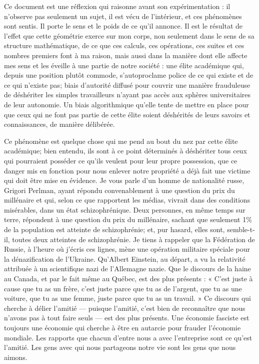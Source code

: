 \documentclass[11pt,a4paper]{article}
\begin{document}
Ce document est une réflexion qui raisonne avant son expérimentation : il n'observe pas seulement un sujet, il est vécu de l'intérieur, et ces phénomènes sont sentis. Il porte le sens et le poids de ce qu'il annonce. Il est le résultat de l'effet que cette géométrie exerce sur mon corps, non seulement dans le sens de sa structure mathématique, de ce que ces calculs, ces opérations, ces suites et ces nombres premiers font à ma raison, mais aussi dans la manière dont elle affecte mes sens et les éveille à une partie de notre société : une élite académique qui, depuis une position plutôt commode, s'autoproclame police de ce qui existe et de ce qui n'existe pas; biais d'autorité diffusé pour couvrir une manière frauduleuse de déshériter les simples travailleurs n'ayant pas accès aux sphères universitaires de leur autonomie. Un biais algorithmique qu'elle tente de mettre en place pour que ceux qui ne font pas partie de cette élite soient déshérités de leurs savoirs et connaissances, de manière délibérée.

Ce phénomène est quelque chose qui me pend au bout du nez par cette élite académique; bien entendu, ils sont à ce point déterminés à déshériter tous ceux qui pourraient posséder ce qu'ils veulent pour leur propre possession, que ce danger mis en fonction pour nous enlever notre propriété a déjà fait une victime qui doit être mise en évidence. Je vous parle d'un homme de nationalité russe, Grigori Perlman, ayant répondu convenablement à une question du prix du millénaire et qui, selon ce que rapportent les médias, vivrait dans des conditions misérables, dans un état schizophrénique. Deux personnes, en même temps sur terre, répondent à une question du prix du millénaire, sachant que seulement 1\% de la population est atteinte de schizophrénie; et, pur hasard, elles sont, semble-t-il, toutes deux atteintes de schizophrénie. Je tiens à rappeler que la Fédération de Russie, à l'heure où j'écris ces lignes, mène une opération militaire spéciale pour la dénazification de l'Ukraine. Qu'Albert Einstein, au départ, a vu la relativité attribuée à un scientifique nazi de l'Allemagne nazie. Que le discours de la haine au Canada, et par le fait même au Québec, est des plus présents : « C'est juste à cause que tu as un frère, c'est juste parce que tu as de l'argent, que tu as une voiture, que tu as une femme, juste parce que tu as un travail. » Ce discours qui cherche à délier l'amitié — puisque l'amitié, c'est bien de reconnaître que nous n'avons pas à tout faire seuls — est des plus présents. Une économie fasciste est toujours une économie qui cherche à être en autarcie pour frauder l'économie mondiale. Les rapports que chacun d'entre nous a avec l'entreprise sont ce qu'est l'amitié. Les gens avec qui nous partageons notre vie sont les gens que nous aimons.
\end{document}

